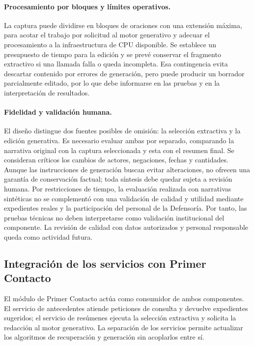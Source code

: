 	\paragraph{Procesamiento por bloques y límites operativos.}
	La captura puede dividirse en bloques de oraciones con una extensión máxima, para
	acotar el trabajo por solicitud al motor generativo y adecuar el procesamiento a la
	infraestructura de CPU disponible. Se establece un presupuesto de tiempo para la
	edición y se prevé conservar el fragmento extractivo si una llamada falla o queda
	incompleta. Esa contingencia evita descartar contenido por errores de generación,
	pero puede producir un borrador parcialmente editado, por lo que debe informarse
	en las pruebas y en la interpretación de resultados.

	\paragraph{Fidelidad y validación humana.}
	El diseño distingue dos fuentes posibles de omisión: la selección extractiva y la
	edición generativa. Es necesario evaluar ambas por separado, comparando la narrativa
	original con la captura seleccionada y esta con el resumen final. Se consideran
	críticos los cambios de actores, negaciones, fechas y cantidades. Aunque las
	instrucciones de generación buscan evitar alteraciones, no ofrecen una garantía
	de conservación factual; toda síntesis debe quedar sujeta a revisión humana.
	Por restricciones de tiempo, la evaluación realizada con narrativas sintéticas
	no se complementó con una validación de calidad y utilidad mediante expedientes
	reales y la participación del personal de la Defensoría. Por tanto, las pruebas
	técnicas no deben interpretarse como validación institucional del componente.
	La revisión de calidad con datos autorizados y personal responsable queda como
	actividad futura.

	\subsection{Integración de los servicios con Primer Contacto}
	\label{sec:integracion_ia}
	El módulo de Primer Contacto actúa como consumidor de ambos componentes. El servicio
	de antecedentes atiende peticiones de consulta y devuelve expedientes sugeridos;
	el servicio de resúmenes ejecuta la selección extractiva y solicita la redacción
	al motor generativo. La separación de los servicios permite actualizar los
	algoritmos de recuperación y generación sin acoplarlos entre sí.

